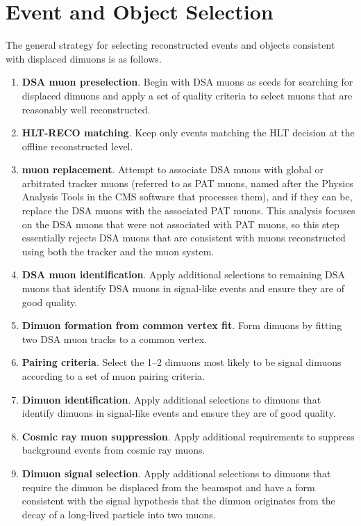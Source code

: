\section{Event and Object Selection}
The general strategy for selecting reconstructed events and objects consistent with displaced dimuons is as follows.
\begin{enumerate}
  \item \textbf{DSA muon preselection}. Begin with DSA muons as seeds for searching for displaced dimuons and apply a set of quality criteria to select muons that are reasonably well reconstructed.
  \item \textbf{HLT-RECO matching}. Keep only events matching the HLT decision at the offline reconstructed level.
  \item \textbf{\DSAToPAT muon replacement}. Attempt to associate DSA muons with global or arbitrated tracker muons (referred to as PAT muons, named after the Physics Analysis Tools in the CMS software that processes them), and if they can be, replace the DSA muons with the associated PAT muons. This analysis focuses on the DSA muons that were not associated with PAT muons, so this step essentially rejects DSA muons that are consistent with muons reconstructed using both the tracker and the muon system.
  \item \textbf{DSA muon identification}. Apply additional selections to remaining DSA muons that identify DSA muons in signal-like events and ensure they are of good quality.
  \item \textbf{Dimuon formation from common vertex fit}. Form dimuons by fitting two DSA muon tracks to a common vertex.
  \item \textbf{Pairing criteria}. Select the 1--2 dimuons most likely to be signal dimuons according to a set of muon pairing criteria.
  \item \textbf{Dimuon identification}. Apply additional selections to dimuons that identify dimuons in signal-like events and ensure they are of good quality.
  \item \textbf{Cosmic ray muon suppression}. Apply additional requirements to suppress background events from cosmic ray muons.
  \item \textbf{Dimuon signal selection}. Apply additional selections to dimuons that require the dimuon be displaced from the beamspot and have a form consistent with the signal hypothesis that the dimuon originates from the decay of a long-lived particle into two muons.
\end{enumerate}

